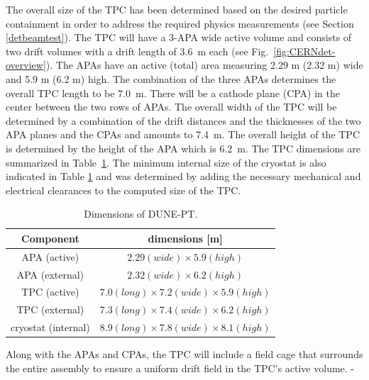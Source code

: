 The overall size of the TPC has been determined based on the desired particle containment in order to address the required physics measurements (see Section \ref{detbeamtest}). The TPC will have a 3-APA wide active volume and consists of two drift volumes with a drift length of 3.6~m each (see Fig.~\ref{fig:CERNdet-overview}).  
The APAs have an active (total) area measuring 2.29 m (2.32 m) wide and 5.9 m (6.2 m) high. The combination of the three APAs determines the overall TPC length to be 7.0~m. There will be a cathode plane (CPA) in the center between the two rows of APAs.  
The overall width of the TPC will be determined by a combination of the drift distances and the thicknesses of the two APA planes and the 
CPAs and amounts to 7.4~m.  
The overall height of the TPC is determined by the height of the APA which is 6.2~m.  The TPC dimensions are summarized in 
Table~\ref{table:TPC-dim}.
%
The minimum internal size of the cryostat is also indicated in Table \ref{table:TPC-dim} and was determined by adding the necessary mechanical and electrical clearances to the computed size of the TPC.  
 
\begin{table}[h]
\centering
\begin{tabular}{|c|c|}
\hline
\textbf{ Component } & dimensions [m]  \\ \hline \hline
APA  (active) &  $2.29 (wide) \times 5.9 (high)$ \\ \hline
APA  (external) &  $2.32 (wide) \times 6.2 (high)$ \\ \hline
TPC (active)       & $7.0 (long) \times 7.2 (wide) \times 5.9 (high)$  \\ \hline
TPC (external)       & $7.3 (long) \times 7.4 (wide) \times 6.2 (high)$  \\ \hline
cryostat (internal) &  $8.9 (long) \times 7.8 (wide) \times 8.1 (high)$  \\ \hline
\end{tabular}
\caption{Dimensions of DUNE-PT.}
\label{table:TPC-dim}
\end{table} 

Along with the APAs and CPAs, the TPC will include a field cage that surrounds the entire assembly to ensure a uniform drift field in the TPC's active volume. -


